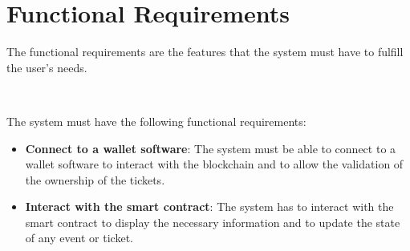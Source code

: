 \section{Functional Requirements}
\label{sec:functional_requirements}

The functional requirements are the features that the system must have to fulfill the user's needs.

~

The system must have the following functional requirements:
\begin{itemize}
    \item \textbf{Connect to a wallet software}: The system must be able to connect to a wallet software to interact with the blockchain and to allow the validation of the ownership of the tickets.
    \item \textbf{Interact with the smart contract}: The system has to interact with the smart contract to display the necessary information and to update the state of any event or ticket.
\end{itemize}
